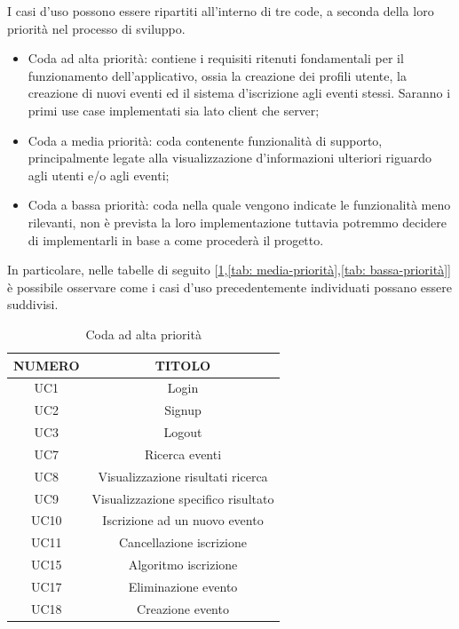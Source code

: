 I casi d'uso possono essere ripartiti all'interno di tre code, a seconda della loro priorità nel processo di sviluppo.
\begin{itemize}
    \item Coda ad alta priorità: contiene i requisiti ritenuti fondamentali per il funzionamento dell'applicativo, ossia la creazione dei profili utente, la creazione di nuovi eventi ed il sistema d'iscrizione agli eventi stessi. Saranno i primi use case implementati sia lato client che server;
    \item Coda a media priorità: coda contenente funzionalità di supporto, principalmente legate alla visualizzazione d'informazioni ulteriori riguardo agli utenti e/o agli eventi;
    \item Coda a bassa priorità: coda nella quale vengono indicate le funzionalità meno rilevanti, non è prevista la loro implementazione tuttavia potremmo decidere di implementarli in base a come procederà il progetto.
\end{itemize}

In particolare, nelle tabelle di seguito [\ref*{tab: alta-priorità},\ref*{tab: media-priorità},\ref*{tab: bassa-priorità}] 
è possibile osservare come i casi d'uso precedentemente individuati possano essere suddivisi.
\clearpage

\begin{table}
\begin{center}
\begin{tabular}{|c|c|}
 \hline
 \textbf{NUMERO}& \textbf{TITOLO} \\ \hline
 UC1& Login\\ \hline
 UC2& Signup\\ \hline
 UC3& Logout\\ \hline
 UC7 & Ricerca eventi \\ \hline
 UC8 & Visualizzazione risultati ricerca \\ \hline
 UC9 & Visualizzazione specifico risultato \\ \hline
 UC10 & Iscrizione ad un nuovo evento\\ \hline
 UC11 & Cancellazione iscrizione\\ \hline
 UC15& Algoritmo iscrizione\\ \hline
 UC17& Eliminazione evento\\ \hline
 UC18& Creazione evento\\ \hline
\end{tabular}
  \caption{Coda ad alta priorità}
  \label{tab: alta-priorità}
\end{center}
\end{table}


